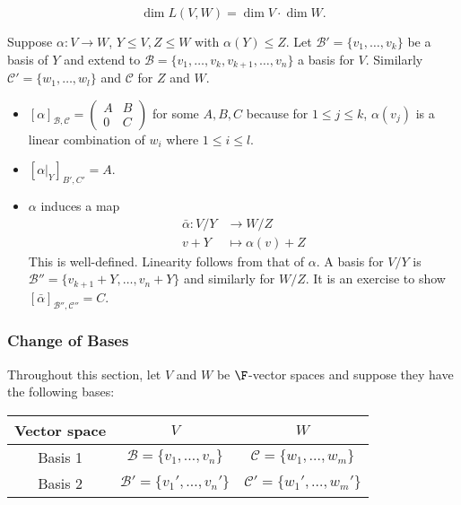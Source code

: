 \documentclass[a4paper]{article}
\newcommand*{\basis}{\mathcal}
\theoremstyle{definition}
\begin{document}
\begin{corollary}
  \label{cor:dim of hom}
  \[
\dim L(V,W) = \dim V \cdot \dim W.
  \]
\end{corollary}

\begin{eg}
  Suppose \(\alpha:V\to W\), \(Y\leq V, Z\leq W\) with \(\alpha(Y)\leq Z\). Let \(\basis B'=\{v_1,\ldots,v_k\}\) be a basis of \(Y\) and extend to \(\basis B=\{v_1,\dots,v_k,v_{k+1}, \dots, v_n\}\) a basis for \(V\). Similarly \(\basis C' = \{w_1,\dots,w_l\}\) and \(\basis C\) for \(Z\) and \(W\).
  \begin{itemize}
  \item \([\alpha]_{\basis B, \basis C} =
\begin{pmatrix}
  A & B \\
  0 & C
\end{pmatrix}
\) for some \(A, B, C\) because for \(1\leq j \leq k\), \(\alpha(v_j)\) is a linear combination of \(w_i\) where \(1\leq i \leq l\).
  \item \([\alpha|_Y]_{B',C'} = A. \)
  \item \(\alpha\) induces a map
    \begin{align*}
      \bar\alpha: V/Y &\to W/Z \\
      v+ Y &\mapsto \alpha(v) + Z
    \end{align*}
    This is well-defined. Linearity follows from that of \(\alpha\). A basis for \(V/Y\) is \(\basis B''=\{v_{k+1}+Y,\ldots,v_n+Y\}\) and similarly for \(W/Z\). It is an exercise to show \([\bar\alpha]_{\basis B'', \basis C''} = C \).
  \end{itemize}
\end{eg}

\subsubsection{Change of Bases}

Throughout this section, let \(V\) and \(W\) be \(\F\)-vector spaces and suppose they have the following bases:
\begin{table}[htbp]
  \centering
  \begin{tabular}{|c||c|c|}
    \hline
    Vector space & \(V\) & \(W\) \\ \hline
    Basis 1 & \(\basis B = \{v_1,\dots,v_n\}\) & \(\basis C = \{w_1,\dots,w_m\}\) \\ \hline
    Basis 2 & \(\basis B' = \{v_1',\dots,v_n'\}\) & \(\basis C' = \{w_1',\dots,w_m'\}\) \\ \hline
  \end{tabular}
\end{table}
\end{document}

